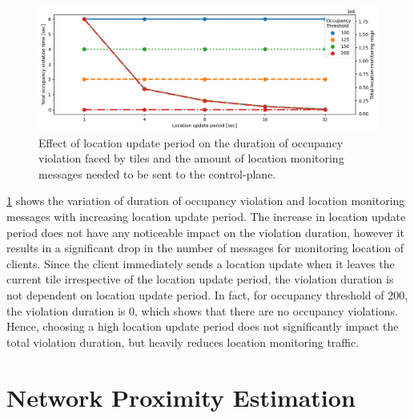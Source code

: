 \begin{figure}
\centering
\includegraphics[width=\linewidth]{figures/design_space/spatial/loc_update_period_tradeoff.png}
\caption{Effect of location update period on the duration of occupancy violation faced by tiles and the amount of location monitoring messages needed to be sent to the control-plane.}
\label{fig:location_update_period}
\end{figure}
\cref{fig:location_update_period} shows the variation of duration of occupancy violation and location monitoring messages with increasing location update period. The increase in location update period does not have any noticeable impact on the violation duration, however it results in a significant drop in the number of messages for monitoring location of clients. Since the client immediately sends a location update when it leaves the current tile irrespective of the location update period, the violation duration is not dependent on location update period. In fact, for occupancy threshold of  200, the violation duration is 0, which shows that there are no occupancy violations. Hence, choosing a high location update period does not significantly impact the total violation duration, but heavily reduces location monitoring traffic.

\section{Network Proximity Estimation}

